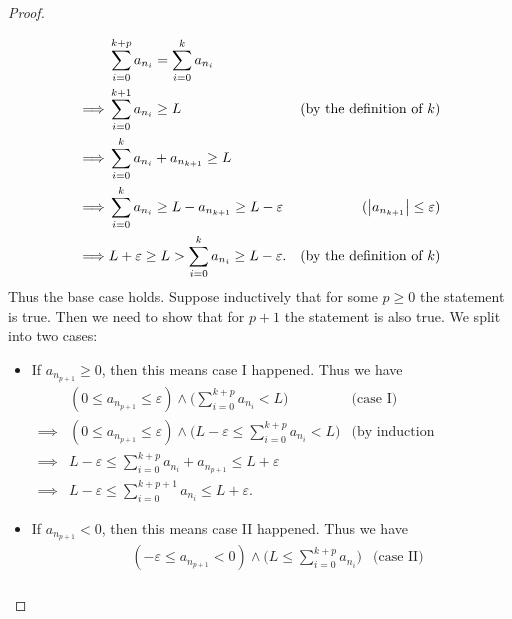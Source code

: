 \begin{proof}
\begin{itemize}
\begin{align*}
                     & \sum_{i = 0}^{k + p} a_{n_i} = \sum_{i = 0}^k a_{n_i}                                                          \\
            \implies & \sum_{i = 0}^{k + 1} a_{n_i} \geq L                                   & \text{(by the definition of \(k\))}    \\
            \implies & \sum_{i = 0}^k a_{n_i} + a_{n_{k + 1}} \geq L                                                                  \\
            \implies & \sum_{i = 0}^k a_{n_i} \geq L - a_{n_{k + 1}} \geq L - \varepsilon    & (\left\lvert a_{n_{k + 1}}\right\rvert \leq \varepsilon) \\
            \implies & L + \varepsilon \geq L > \sum_{i = 0}^k a_{n_i} \geq L - \varepsilon. & \text{(by the definition of \(k\))}
          \end{align*}
          Thus the base case holds.
          Suppose inductively that for some \(p \geq 0\) the statement is true.
          Then we need to show that for \(p + 1\) the statement is also true.
          We split into two cases:
          \begin{itemize}
            \item If \(a_{n_{p + 1}} \geq 0\), then this means case I happened.
                  Thus we have
                  \begin{align*}
                             & (0 \leq a_{n_{p + 1}} \leq \varepsilon) \land \Bigg(\sum_{i = 0}^{k + p} a_{n_i} < L\Bigg)                      & \text{(case I)}                  \\
                    \implies & (0 \leq a_{n_{p + 1}} \leq \varepsilon) \land \Bigg(L - \varepsilon \leq \sum_{i = 0}^{k + p} a_{n_i} < L\Bigg) & \text{(by induction hypothesis)} \\
                    \implies & L - \varepsilon \leq \sum_{i = 0}^{k + p} a_{n_i} + a_{n_{p + 1}} \leq L + \varepsilon                                                             \\
                    \implies & L - \varepsilon \leq \sum_{i = 0}^{k + p + 1} a_{n_i} \leq L + \varepsilon.
                  \end{align*}
            \item If \(a_{n_{p + 1}} < 0\), then this means case II happened.
                  Thus we have
                  \begin{align*}
                             & (-\varepsilon \leq a_{n_{p + 1}} < 0) \land \Bigg(L \leq \sum_{i = 0}^{k + p} a_{n_i}\Bigg) & \text{(case II)}                 \\

\end{align*}
\end{itemize}
\end{itemize}
\end{proof}
